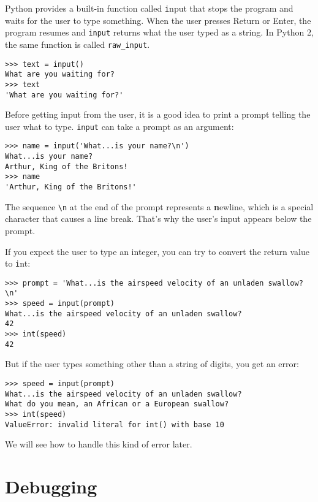 \documentclass[
DIV=11,
fontsize=12,
twoside,
headinclude=false,
titlepage=firstiscover,
abstract=true,
headsepline=true,
footsepline=true,
chapterprefix=true, %
headings=big,
bibliography=totoc,%
captions=tableheading
]{scrbook}
\theoremstyle{definition}
\begin{document}
Python provides a built-in function called {\texttt input} that
stops the program and
waits for the user to type something.  When the user presses {\textsf
  Return} or {\textsf Enter}, the program resumes and \verb"input"
returns what the user typed as a string.  In Python 2, the same
function is called \verb"raw_input".

\begin{lstlisting}
>>> text = input()
What are you waiting for?
>>> text
'What are you waiting for?'
\end{lstlisting}
%
Before getting input from the user, it is a good idea to print a
prompt telling the user what to type.  \verb"input" can take a
prompt as an argument:

\begin{lstlisting}
>>> name = input('What...is your name?\n')
What...is your name?
Arthur, King of the Britons!
>>> name
'Arthur, King of the Britons!'
\end{lstlisting}
%
The sequence \verb"\n" at the end of the prompt represents a {\textbf
  newline}, which is a special character that causes a line break.
That's why the user's input appears below the prompt.  

If you expect the user to type an integer, you can try to convert
the return value to {\texttt int}:

\begin{lstlisting}
>>> prompt = 'What...is the airspeed velocity of an unladen swallow?\n'
>>> speed = input(prompt)
What...is the airspeed velocity of an unladen swallow?
42
>>> int(speed)
42
\end{lstlisting}
%
But if the user types something other than a string of digits,
you get an error:

\begin{lstlisting}
>>> speed = input(prompt)
What...is the airspeed velocity of an unladen swallow?
What do you mean, an African or a European swallow?
>>> int(speed)
ValueError: invalid literal for int() with base 10
\end{lstlisting}
%
We will see how to handle this kind of error later.


\section{Debugging}
\label{whitespace}
\end{document}

